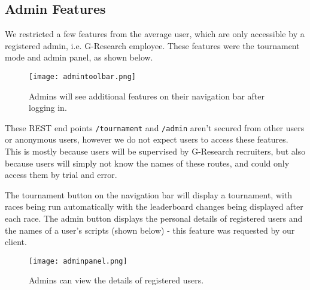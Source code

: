 \subsection{Admin Features}

We restricted a few features from the average user, which are only accessible by a registered admin, i.e. G-Research employee. These features were the tournament mode and admin panel, as shown below.

\begin{figure}[H]
\centering
\texttt{[image: admintoolbar.png]}
\caption{Admins will see additional features on their navigation bar after logging in.}
\end{figure}

These REST end points {\tt/tournament} and {\tt/admin} aren't secured from other users or anonymous users, however we do not expect users to access these features. This is mostly because users will be supervised by G-Research recruiters, but also because users will simply not know the names of these routes, and could only access them by trial and error.

The tournament button on the navigation bar will display a tournament, with races being run automatically with the leaderboard changes being displayed after each race. The admin button displays the personal details of registered users and the names of a user's scripts (shown below) - this feature was requested by our client. 
\begin{figure}[H]
\centering
\texttt{[image: adminpanel.png]}
\caption{Admins can view the details of registered users.}
\end{figure}

